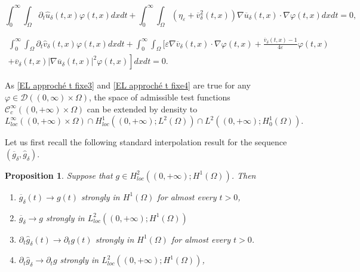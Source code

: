\documentclass[reqno,12pt,twoside]{amsart}
\newtheorem{proposition}{Proposition}[section]
\numberwithin{equation}{section} \numberwithin{theorem}{section}
\numberwithin{proposition}{section} \numberwithin{lemma}{section}
\numberwithin{corollary}{section}
\numberwithin{definition}{section} \numberwithin{remark}{section}
\begin{document}
\begin{equation}\label{EL approché t fixe3}
\int_0^\infty\int_\Omega \partial_t \hat{u}_\delta (t,x)\varphi(t,x)dxdt +\int_0^\infty\int_\Omega (\eta_\varepsilon + \overline{v}_\delta^2(t,x)) \nabla \overline{u}_\delta(t,x) \cdot \nabla\varphi(t,x)dxdt = 0,
\end{equation}

\begin{multline}\label{EL approché t fixe4}
\int_0^\infty\int_\Omega \partial_t \hat{v}_\delta (t,x) \varphi(t,x)dxdt +\int_0^\infty\int_\Omega \bigg[\varepsilon\nabla \overline{v}_\delta(t,x) \cdot \nabla \varphi (t,x) + \frac{\overline{v}_\delta(t,x) -1}{4\varepsilon}\varphi(t,x)\\
\left. + \overline{v}_\delta(t,x) |\nabla \overline{u}_\delta(t,x)|^2 \varphi(t,x)\right]dxdt =0.
\end{multline}

As \eqref{EL approché t fixe3} and \eqref{EL approché t fixe4} are true for any $\varphi \in \mathcal{D}((0,\infty)\times \Omega)$,
the space of admissible test functions $\mathcal{C}_c^\infty((0,+\infty) \times \Omega)$ can be extended by density to $L_{loc}^\infty((0,+\infty) \times \Omega) \cap H_{loc}^1((0,+\infty); L^2(\Omega)) \cap L^2((0,+\infty); H_0^1(\Omega))$. 

\smallskip

Let us first recall the following standard interpolation result for the sequence $(\overline{g}_\delta , \hat{g}_\delta)$. 

\begin{proposition}\label{prop : cv g}
Suppose that $g \in H^2_{loc}((0,+\infty); H^1(\Omega))$. Then 

\begin{enumerate}
\item $\overline{g}_\delta (t) \longrightarrow g(t)$ strongly in $H^1(\Omega)$ for almost every $t >0$,

\item $\overline{g}_\delta \longrightarrow g$ strongly in $L^2_{loc}((0,+\infty) ; H^1(\Omega))$

\item $\partial_t \hat{g}_\delta (t) \longrightarrow \partial_t g(t)$ strongly in $H^1(\Omega)$ for almost every $t >0$. 

\item $\partial_t \hat{g}_\delta \longrightarrow \partial_t g$ strongly in $L^2_{loc}((0,+\infty) ; H^1(\Omega))$, 

\end{enumerate}
\end{proposition}
\end{document}
